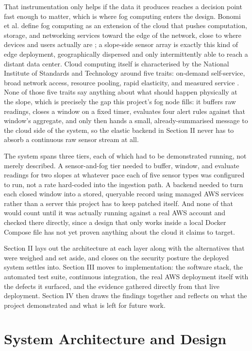 \documentclass[conference]{IEEEtran}
\begin{document}
That instrumentation only helps if the data it produces reaches a decision point fast enough to matter, which is where fog computing enters the design. Bonomi et al. define fog computing as an extension of the cloud that pushes computation, storage, and networking services toward the edge of the network, close to where devices and users actually are \cite{ref1}; a slope-side sensor array is exactly this kind of edge deployment, geographically dispersed and only intermittently able to reach a distant data center. Cloud computing itself is characterised by the National Institute of Standards and Technology around five traits: on-demand self-service, broad network access, resource pooling, rapid elasticity, and measured service \cite{ref2}. None of those five traits say anything about what should happen physically at the slope, which is precisely the gap this project's fog node fills: it buffers raw readings, closes a window on a fixed timer, evaluates four alert rules against that window's aggregate, and only then hands a small, already-summarised message to the cloud side of the system, so the elastic backend in Section II never has to absorb a continuous raw sensor stream at all.

The system spans three tiers, each of which had to be demonstrated running, not merely described. A sensor-and-fog tier needed to buffer, window, and evaluate readings for two slopes at whatever pace each of five sensor types was configured to run, not a rate hard-coded into the ingestion path. A backend needed to turn each closed window into a stored, queryable record using managed AWS services rather than a server this project has to keep patched itself. And none of that would count until it was actually running against a real AWS account and checked there directly, since a design that only works inside a local Docker Compose file has not yet proven anything about the cloud it claims to target.

Section II lays out the architecture at each layer along with the alternatives that were weighed and set aside, and closes on the security posture the deployed system settles into. Section III moves to implementation: the software stack, the automated test suite, continuous integration, the real AWS deployment itself with the defects it surfaced, and the evidence gathered directly from that live deployment. Section IV then draws the findings together and reflects on what the project demonstrated and what is left for future work.

\section{System Architecture and Design}
\end{document}
